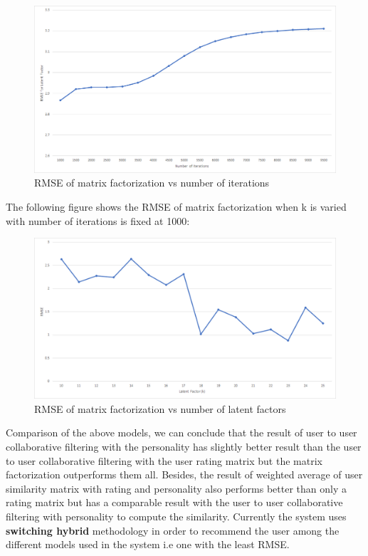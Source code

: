 \begin{figure}[!ht]
\centering
\includegraphics[width = \textwidth ]{fig/rmse_step.png}
\caption{RMSE of matrix factorization vs number of iterations}
\label{fig:rmse_step}
\end{figure}

The following figure shows the RMSE of matrix factorization when k is varied with number of iterations is fixed at 1000:
\begin{figure}[!ht]
\centering
\includegraphics[width = \textwidth ]{fig/rmse_k.png}
\caption{RMSE of matrix factorization vs number of latent factors}
\label{fig:rmse_k}
\end{figure}

Comparison of the above models, we can conclude that the result of user to user collaborative filtering with the personality has slightly better result than the user to user collaborative filtering with the user rating matrix but the matrix factorization outperforms them all. Besides, the result of weighted average of user similarity matrix with rating and personality also performs better than only a rating matrix but has a comparable result with the user to user collaborative filtering with personality to compute the similarity. Currently the system uses \textbf{switching hybrid} methodology in order to recommend the user among the different models used in the system i.e one with the least RMSE.
